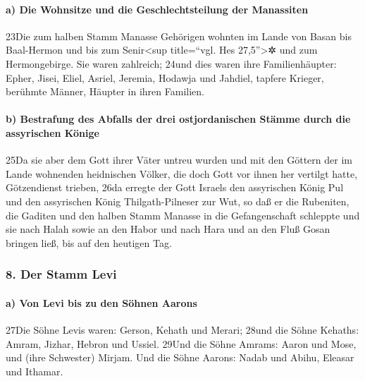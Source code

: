 \hypertarget{a-die-wohnsitze-und-die-geschlechtsteilung-der-manassiten}{%
\paragraph{a) Die Wohnsitze und die Geschlechtsteilung der
Manassiten}\label{a-die-wohnsitze-und-die-geschlechtsteilung-der-manassiten}}

23Die zum halben Stamm Manasse Gehörigen wohnten im Lande von Basan bis
Baal-Hermon und bis zum Senir\textless sup title=``vgl. Hes
27,5''\textgreater✲ und zum Hermongebirge. Sie waren zahlreich; 24und
dies waren ihre Familienhäupter: Epher, Jisei, Eliel, Asriel, Jeremia,
Hodawja und Jahdiel, tapfere Krieger, berühmte Männer, Häupter in ihren
Familien.

\hypertarget{b-bestrafung-des-abfalls-der-drei-ostjordanischen-stuxe4mme-durch-die-assyrischen-kuxf6nige}{%
\paragraph{b) Bestrafung des Abfalls der drei ostjordanischen Stämme
durch die assyrischen
Könige}\label{b-bestrafung-des-abfalls-der-drei-ostjordanischen-stuxe4mme-durch-die-assyrischen-kuxf6nige}}

25Da sie aber dem Gott ihrer Väter untreu wurden und mit den Göttern der
im Lande wohnenden heidnischen Völker, die doch Gott vor ihnen her
vertilgt hatte, Götzendienst trieben, 26da erregte der Gott Israels den
assyrischen König Pul und den assyrischen König Thilgath-Pilneser zur
Wut, so daß er die Rubeniten, die Gaditen und den halben Stamm Manasse
in die Gefangenschaft schleppte und sie nach Halah sowie an den Habor
und nach Hara und an den Fluß Gosan bringen ließ, bis auf den heutigen
Tag.

\hypertarget{der-stamm-levi}{%
\subsubsection{8. Der Stamm Levi}\label{der-stamm-levi}}

\hypertarget{a-von-levi-bis-zu-den-suxf6hnen-aarons}{%
\paragraph{a) Von Levi bis zu den Söhnen
Aarons}\label{a-von-levi-bis-zu-den-suxf6hnen-aarons}}

27Die Söhne Levis waren: Gerson, Kehath und Merari; 28und die Söhne
Kehaths: Amram, Jizhar, Hebron und Ussiel. 29Und die Söhne Amrams: Aaron
und Mose, und (ihre Schwester) Mirjam. Und die Söhne Aarons: Nadab und
Abihu, Eleasar und Ithamar.

